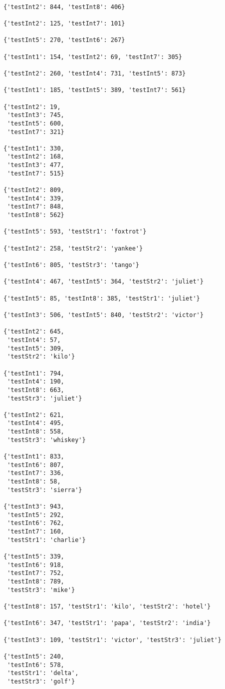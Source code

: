 \begin{verbatim}

{'testInt2': 844, 'testInt8': 406}

{'testInt2': 125, 'testInt7': 101}

{'testInt5': 270, 'testInt6': 267}

{'testInt1': 154, 'testInt2': 69, 'testInt7': 305}

{'testInt2': 260, 'testInt4': 731, 'testInt5': 873}

{'testInt1': 185, 'testInt5': 389, 'testInt7': 561}

{'testInt2': 19,
 'testInt3': 745,
 'testInt5': 600,
 'testInt7': 321}

{'testInt1': 330,
 'testInt2': 168,
 'testInt3': 477,
 'testInt7': 515}

{'testInt2': 809,
 'testInt4': 339,
 'testInt7': 848,
 'testInt8': 562}

{'testInt5': 593, 'testStr1': 'foxtrot'}

{'testInt2': 258, 'testStr2': 'yankee'}

{'testInt6': 805, 'testStr3': 'tango'}

{'testInt4': 467, 'testInt5': 364, 'testStr2': 'juliet'}

{'testInt5': 85, 'testInt8': 385, 'testStr1': 'juliet'}

{'testInt3': 506, 'testInt5': 840, 'testStr2': 'victor'}

{'testInt2': 645,
 'testInt4': 57,
 'testInt5': 309,
 'testStr2': 'kilo'}

{'testInt1': 794,
 'testInt4': 190,
 'testInt8': 663,
 'testStr3': 'juliet'}

{'testInt2': 621,
 'testInt4': 495,
 'testInt8': 558,
 'testStr3': 'whiskey'}

{'testInt1': 833,
 'testInt6': 807,
 'testInt7': 336,
 'testInt8': 58,
 'testStr3': 'sierra'}

{'testInt3': 943,
 'testInt5': 292,
 'testInt6': 762,
 'testInt7': 160,
 'testStr1': 'charlie'}

{'testInt5': 339,
 'testInt6': 918,
 'testInt7': 752,
 'testInt8': 789,
 'testStr3': 'mike'}

{'testInt8': 157, 'testStr1': 'kilo', 'testStr2': 'hotel'}

{'testInt6': 347, 'testStr1': 'papa', 'testStr2': 'india'}

{'testInt3': 109, 'testStr1': 'victor', 'testStr3': 'juliet'}

{'testInt5': 240,
 'testInt6': 578,
 'testStr1': 'delta',
 'testStr3': 'golf'}


\end{verbatim}
